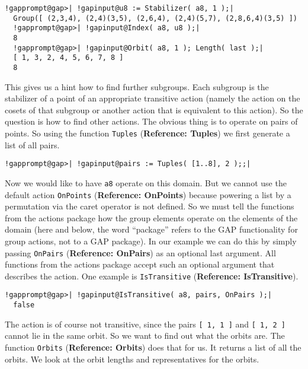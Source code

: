 \documentclass[a4paper,11pt]{report}
\begin{document}
{{ 
\begin{Verbatim}[commandchars=!@|,fontsize=\small,frame=single,label=Example]
  !gapprompt@gap>| !gapinput@u8 := Stabilizer( a8, 1 );|
  Group([ (2,3,4), (2,4)(3,5), (2,6,4), (2,4)(5,7), (2,8,6,4)(3,5) ])
  !gapprompt@gap>| !gapinput@Index( a8, u8 );|
  8
  !gapprompt@gap>| !gapinput@Orbit( a8, 1 ); Length( last );|
  [ 1, 3, 2, 4, 5, 6, 7, 8 ]
  8
\end{Verbatim}
 

 This gives us a hint how to find further subgroups. Each subgroup is the
stabilizer of a point of an appropriate transitive action (namely the action
on the cosets of that subgroup or another action that is equivalent to this
action). So the question is how to find other actions. The obvious thing is to
operate on pairs of points. So using the function \texttt{Tuples} (\textbf{Reference: Tuples}) we first generate a list of all pairs. 

 
\begin{Verbatim}[commandchars=!@|,fontsize=\small,frame=single,label=Example]
  !gapprompt@gap>| !gapinput@pairs := Tuples( [1..8], 2 );;|
\end{Verbatim}
 

 Now we would like to have \texttt{a8} operate on this domain. But we cannot use the default action \texttt{OnPoints} (\textbf{Reference: OnPoints}) because powering a list by a permutation via the caret operator \texttt{\texttt{}} is not defined. So we must tell the functions from the actions package how the
group elements operate on the elements of the domain (here and below, the word ``package'' refers to the \textsf{GAP} functionality for group actions, not to a \textsf{GAP} package). In our example we can do this by simply passing \texttt{OnPairs} (\textbf{Reference: OnPairs}) as an optional last argument. All functions from the actions package accept
such an optional argument that describes the action. One example is \texttt{IsTransitive} (\textbf{Reference: IsTransitive}). 

 
\begin{Verbatim}[commandchars=!@|,fontsize=\small,frame=single,label=Example]
  !gapprompt@gap>| !gapinput@IsTransitive( a8, pairs, OnPairs );|
  false
\end{Verbatim}
 

 The action is of course not transitive, since the pairs \texttt{[ 1, 1 ]} and \texttt{[ 1, 2 ]} cannot lie in the same orbit. So we want to find out what the orbits are. The
function \texttt{Orbits} (\textbf{Reference: Orbits}) does that for us. It returns a list of all the orbits. We look at the orbit
lengths and representatives for the orbits. 

}}
\end{document}
